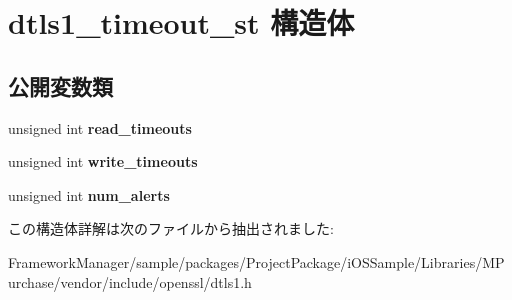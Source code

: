 \hypertarget{structdtls1__timeout__st}{}\section{dtls1\+\_\+timeout\+\_\+st 構造体}
\label{structdtls1__timeout__st}
\subsection*{公開変数類}
\begin{DoxyCompactItemize}
\item 
\hypertarget{structdtls1__timeout__st_a6ea960c7ff443be84029bb3252c6e144}{}unsigned int {\bfseries read\+\_\+timeouts}\label{structdtls1__timeout__st_a6ea960c7ff443be84029bb3252c6e144}

\item 
\hypertarget{structdtls1__timeout__st_af3fb942d16bbbdf73e6151d7e4e6113b}{}unsigned int {\bfseries write\+\_\+timeouts}\label{structdtls1__timeout__st_af3fb942d16bbbdf73e6151d7e4e6113b}

\item 
\hypertarget{structdtls1__timeout__st_ab525be86e71d151a15e58e877d1dcd4e}{}unsigned int {\bfseries num\+\_\+alerts}\label{structdtls1__timeout__st_ab525be86e71d151a15e58e877d1dcd4e}

\end{DoxyCompactItemize}


この構造体詳解は次のファイルから抽出されました\+:\begin{DoxyCompactItemize}
\item 
Framework\+Manager/sample/packages/\+Project\+Package/i\+O\+S\+Sample/\+Libraries/\+M\+Purchase/vendor/include/openssl/dtls1.\+h\end{DoxyCompactItemize}
